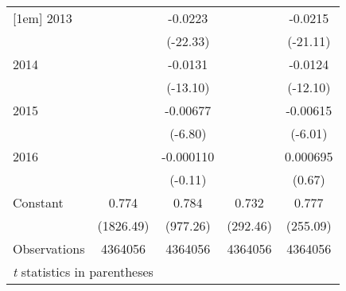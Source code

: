 \begin{table}[htbp]
\begin{tabular}{l*{4}{c}}
[1em]
2013                &            &     -0.0223&            &     -0.0215\\
                    &            &    (-22.33)&            &    (-21.11)\\
[1em]
2014                &            &     -0.0131&            &     -0.0124\\
                    &            &    (-13.10)&            &    (-12.10)\\
[1em]
2015                &            &    -0.00677&            &    -0.00615\\
                    &            &     (-6.80)&            &     (-6.01)\\
[1em]
2016                &            &   -0.000110&            &    0.000695\\
                    &            &     (-0.11)&            &      (0.67)\\
[1em]
Constant            &       0.774&       0.784&       0.732&       0.777\\
                    &   (1826.49)&    (977.26)&    (292.46)&    (255.09)\\
\hline
Observations        &     4364056&     4364056&     4364056&     4364056\\
\hline\hline
\multicolumn{5}{l}{\footnotesize \textit{t} statistics in parentheses}\\
\end{tabular}
\end{table}
